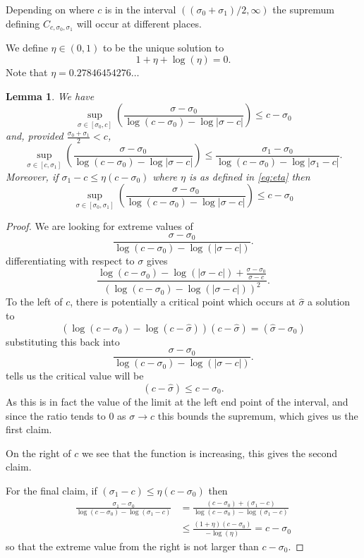 \documentclass[10pt,english,letter, reqno]{amsart}
\theoremstyle{plain}
\newtheorem{lemma}[theorem]{Lemma}
\theoremstyle{definition}
\begin{document}
Depending on where $c$ is in the interval $((\sigma_0+\sigma_1)/2, \infty)$ the supremum defining $C_{c,\sigma_0,\sigma_1}$ will occur at different places.

 We define $\eta \in(0,1)$ to be the unique solution to 
\begin{equation}\label{eq:eta}
1+\eta + \log(\eta)=0.
\end{equation}
Note that $\eta = 0.27846454276\ldots$

\begin{lemma}\label{lem:supremumforarg}
We have
\[
\sup_{\sigma\in[\sigma_0,c]}\left(\frac{\sigma  - \sigma_0}{\log(c-\sigma_0)-\log|\sigma -c|} \right) \leq c-\sigma_0
\]
and, provided $\frac{\sigma_0+\sigma_1}{2} < c$,
\[
\sup_{\sigma\in[c,\sigma_1]}\left(\frac{\sigma  - \sigma_0}{\log(c-\sigma_0)-\log|\sigma -c|} \right) \leq \frac{\sigma_1-\sigma_0}{\log(c-\sigma_0)-\log|\sigma_1-c|}.
\]
Moreover, if $\sigma_1-c \leq \eta(c-\sigma_0)$ where $\eta$ is as defined in \eqref{eq:eta}
then
\[
 \sup_{\sigma\in[\sigma_0,\sigma_1]}\left(\frac{\sigma  - \sigma_0}{\log(c-\sigma_0)-\log|\sigma -c|} \right) \leq c-\sigma_0
\]
\end{lemma}
\begin{proof}
We are looking for extreme values of
\[ \frac{\sigma - \sigma_0}{\log(c-\sigma_0)-\log(|\sigma-c|)}.\]
differentiating with respect to $\sigma$ gives
\[ \frac{\log(c-\sigma_0)-\log(|\sigma-c|)  + \frac{\sigma-\sigma_0}{\sigma-c}}{(\log(c-\sigma_0)-\log(|\sigma-c|))^2}. \]
To the left of $c$, there is potentially a critical point which occurs at $\hat{\sigma}$ a solution to
\[  (\log(c-\sigma_0)-\log(c-\hat{\sigma}))(c-\hat{\sigma}) = (\hat{\sigma}-\sigma_0)  \]
substituting this back into 
\[ \frac{\sigma - \sigma_0}{\log(c-\sigma_0)-\log(|\sigma-c|)}.\]
tells us the critical value will be
\[(c-\hat{\sigma}) \leq c-\sigma_0 .\]
As this is in fact the value of the limit at the left end point of the interval, and since the ratio tends to $0$ as $\sigma\rightarrow c$ this bounds the supremum, which gives us the first claim.

On the right of $c$ we see that the function is increasing, this gives the second claim.

For the final claim, if $(\sigma_1 - c) \leq \eta(c-\sigma_0)$ then
\begin{align*}
  \frac{\sigma_1 -\sigma_0}{
\log(c-\sigma_0) - \log(\sigma_1-c)}  
&=
\frac{(c-\sigma_0) + (\sigma_1 - c)}{
\log(c-\sigma_0) - \log(\sigma_1-c)}\\
&\leq  \frac{ (1+\eta)(c-\sigma_0)}{-\log(\eta)}
= c-\sigma_0
\end{align*}
so that the extreme value from the right is not larger than $c-\sigma_0$.
\end{proof}
\end{document}
